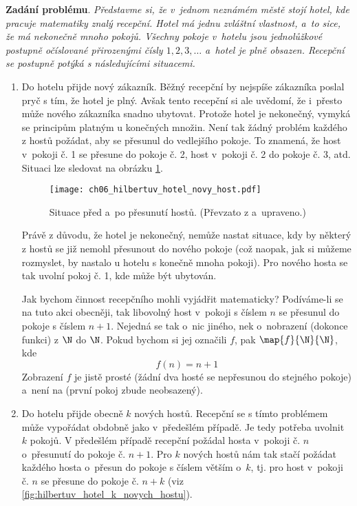\noindent\textbf{Zadání problému}. \textit{Představme si, že v~jednom neznámém městě stojí hotel, kde pracuje matematiky znalý recepční. Hotel má jednu zvláštní vlastnost, a~to sice, že má nekonečně mnoho pokojů. Všechny pokoje v~hotelu jsou jednolůžkové postupně očíslované přirozenými čísly $1,2,3,\dots$ a~hotel je plně obsazen. Recepční se postupně potýká s následujícími situacemi.}
\begin{enumerate}[label=\textit{(\roman*)}]
    \item\label{item:novy_host} Do hotelu přijde nový zákazník. Běžný recepční by nejspíše zákazníka poslal pryč s tím, že hotel je plný. Avšak tento recepční si ale uvědomí, že i~přesto může nového zákazníka snadno ubytovat. Protože hotel je nekonečný, vymyká se principům platným u konečných množin. Není tak žádný problém každého z hostů požádat, aby se přesunul do vedlejšího pokoje. To znamená, že host v~pokoji č. 1 se přesune do pokoje č. 2, host v~pokoji č. 2 do pokoje č. 3, atd. Situaci lze sledovat na obrázku \ref{fig:hilbertuv_hotel_novy_host}.
    \begin{figure}[h]
        \centering
        \texttt{[image: ch06\_hilbertuv\_hotel\_novy\_host.pdf]}
        \caption{Situace před a~po přesunutí hostů. (Převzato z \cite{Rmoutil2022} a~upraveno.)}
        \label{fig:hilbertuv_hotel_novy_host}
    \end{figure}
    Právě z důvodu, že hotel je nekonečný, nemůže nastat situace, kdy by některý z hostů se již nemohl přesunout do nového pokoje (což naopak, jak si můžeme rozmyslet, by nastalo u hotelu s konečně mnoha pokoji). Pro nového hosta se tak uvolní pokoj č. 1, kde může být ubytován.\par
    Jak bychom činnost recepčního mohli vyjádřit matematicky? Podíváme-li se na tuto akci obecněji, tak libovolný host v~pokoji s číslem $n$ se přesunul do pokoje s číslem $n+1$. Nejedná se tak o~nic jiného, nek o~nobrazení (dokonce funkci) z $\N$ do $\N$. Pokud bychom si jej označili $f$, pak $\map{f}{\N}{\N}$, kde
    \begin{equation*}
        f(n)=n+1
    \end{equation*}
    Zobrazení $f$ je jistě prosté (žádní dva hosté se nepřesunou do stejného pokoje) a~není na (první pokoj zbude neobsazený).
    \item\label{item:k_novych_hostu} Do hotelu přijde obecně $k$ nových hostů. Recepční se s tímto problémem může vypořádat obdobně jako v~předešlém případě. Je tedy potřeba uvolnit $k$ pokojů. V předešlém případě recepční požádal hosta v~pokoji č. $n$ o~přesunutí do pokoje č. $n+1$. Pro $k$ nových hostů nám tak stačí požádat každého hosta o~přesun do pokoje s číslem větším o~$k$, tj. pro host v~pokoji č. $n$ se přesune do pokoje č. $n+k$ (viz \ref{fig:hilbertuv_hotel_k_novych_hostu}).

\end{enumerate}
